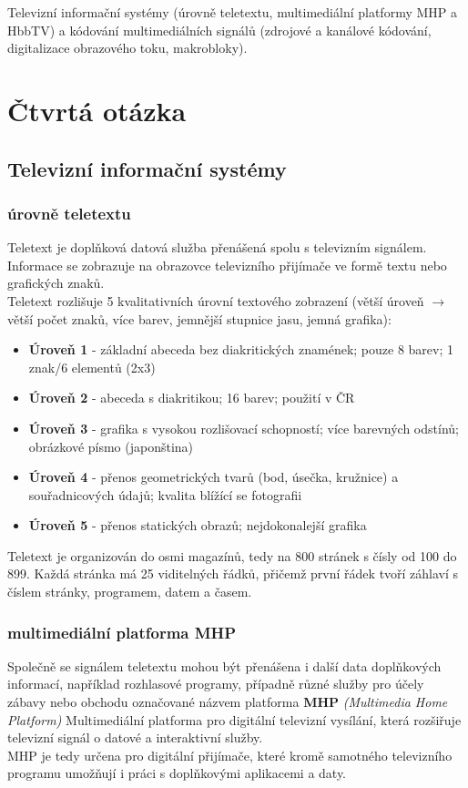 Televizní informační systémy (úrovně teletextu, multimediální platformy MHP a HbbTV) a kódování multimediálních signálů (zdrojové a kanálové kódování, digitalizace obrazového toku, makrobloky).

\chapter{Čtvrtá otázka}
\section{Televizní informační systémy}

\subsection{úrovně teletextu}
Teletext je doplňková datová služba přenášená spolu s televizním signálem.\\
Informace se zobrazuje na obrazovce televizního přijímače ve formě textu
nebo grafických znaků.\\
Teletext rozlišuje 5 kvalitativních úrovní textového zobrazení (větší úroveň $\rightarrow$ větší počet znaků, více barev, jemnější stupnice jasu, jemná grafika):
\begin{itemize}
	\item \textbf{Úroveň 1} - základní abeceda bez diakritických znamének; pouze 8 barev; 1 znak/6 elementů (2x3) 
	\item \textbf{Úroveň 2} - abeceda s diakritikou; 16 barev; použití v ČR
	\item \textbf{Úroveň 3} - grafika s vysokou rozlišovací schopností; více barevných odstínů; obrázkové písmo (japonština)
	\item \textbf{Úroveň 4} - přenos geometrických tvarů (bod, úsečka, kružnice) a souřadnicových údajů; kvalita blížící se fotografii
	\item \textbf{Úroveň 5} - přenos statických obrazů; nejdokonalejší grafika
\end{itemize}
Teletext je organizován do osmi magazínů, tedy na 800 stránek s čísly od 100 do 899. Každá stránka má 25 viditelných řádků, přičemž první řádek tvoří záhlaví s číslem stránky, programem, datem a časem.

\subsection{multimediální platforma MHP }
Společně se signálem teletextu mohou být přenášena i další data doplňkových informací,
například rozhlasové programy, případně různé služby pro účely zábavy nebo obchodu
označované názvem platforma \textbf{MHP} \textit{(Multimedia Home Platform)}
Multimediální platforma pro digitální televizní vysílání, která rozšiřuje televizní signál o datové a interaktivní služby.\\
MHP je tedy určena pro digitální přijímače, které kromě samotného televizního programu umožňují i práci s doplňkovými aplikacemi a daty.


